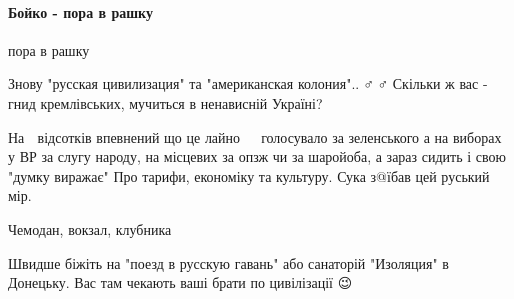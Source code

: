  
 
 
 
 
\paragraph{Бойко - пора в рашку}
\label{sec:18_01_2021.fb.bilchenko_evgenia.1.mova_jazyk.cmt.bojko_pora_v_rashku}

\begin{itemize}
 
пора в рашку

 
Знову "русская цивилизация" та "американская колония"..🤦♂️🤦♂️ Скільки ж вас -
гнид кремлівських, мучиться в ненависній Україні?


 

На 💯 відсотків впевнений що це лайно 💩💩💩 голосувало за зеленського а на
виборах у ВР за слугу народу, на місцевих за опзж чи за шаройоба, а зараз
сидить і свою "думку виражає" Про тарифи, економіку та культуру. Сука з@їбав
цей руський мір.

\begin{itemize}
 
Чемодан, вокзал, клубника
\end{itemize}

 
Швидше біжіть на "поезд в русскую гавань" або санаторій "Изоляция" в Донецьку.
Вас там чекають ваші брати по цивілізації 😉



\end{itemize}
